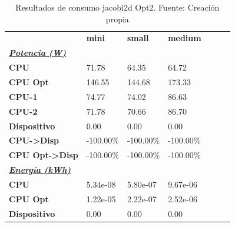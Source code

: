 \begin{table}[H]
    \centering
    \begin{tabular}{lllllll}
    \rowcolor[HTML]{DAE8FC} \ & \textbf{mini} & \textbf{	small} & \textbf{	medium} \\
    \cellcolor[HTML]{DAE8FC} \textbf{\textbf{{\emph{{\underline{{Potencia (W)}}}}}}} &  & 	 & 	 \\
    \rowcolor[HTML]{EFEFEF} \cellcolor[HTML]{DAE8FC} \textbf{CPU} & 71.78 & 	64.35 & 	64.72 \\
    \cellcolor[HTML]{DAE8FC} \textbf{CPU Opt} & 146.55 & 	144.68 & 	173.33 \\
    \rowcolor[HTML]{EFEFEF} \cellcolor[HTML]{DAE8FC} \textbf{\quad CPU-1} & 74.77 & 	74.02 & 	86.63 \\
    \cellcolor[HTML]{DAE8FC} \textbf{\quad CPU-2} & 71.78 & 	70.66 & 	86.70 \\
    \rowcolor[HTML]{EFEFEF} \cellcolor[HTML]{DAE8FC} \textbf{Dispositivo} & 0.00 & 	0.00 & 	0.00 \\
    \cellcolor[HTML]{DAE8FC} \textbf{CPU->Disp} & -100.00\% & 	-100.00\% & 	-100.00\% \\
    \rowcolor[HTML]{EFEFEF} \cellcolor[HTML]{DAE8FC} \textbf{CPU Opt->Disp} & -100.00\% & 	-100.00\% & 	-100.00\% \\
    \cellcolor[HTML]{DAE8FC} \textbf{\textbf{{\emph{{\underline{{Energía (kWh)}}}}}}} &  & 	 & 	 \\
    \rowcolor[HTML]{EFEFEF} \cellcolor[HTML]{DAE8FC} \textbf{CPU} & 5.34e-08 & 	5.80e-07 & 	9.67e-06 \\
    \cellcolor[HTML]{DAE8FC} \textbf{CPU Opt} & 1.22e-05 & 	2.22e-07 & 	2.52e-06 \\
    \rowcolor[HTML]{EFEFEF} \cellcolor[HTML]{DAE8FC} \textbf{Dispositivo} & 0.00 & 	0.00 & 	0.00 \\
    \end{tabular}
    \caption[Resultados de consumo jacobi2d Opt2]{{Resultados de consumo jacobi2d Opt2. Fuente: Creación propia}}
    \label{table_test_jacobi2d_Opt2_hw_powerResults}
\end{table}